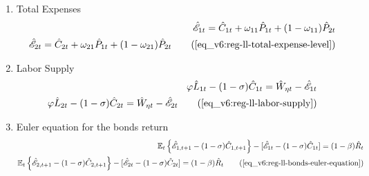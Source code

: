 \documentclass[../thesis.tex]{subfiles}
\begin{document}
{\begin{enumerate}
		
		\begin{comment}
			\item Regional Levels of Consumption and Prices
			\begin{align}
				\hat{C}_{1 1 t} - \hat{C}_{1 2 t} = \hat{P}_{2 t} - \hat{P}_{1 t} \nonumber \\
				\hat{C}_{2 1 t} - \hat{C}_{2 2 t} = \hat{P}_{2 t} - \hat{P}_{1 t} \tag{\ref{eq_v6:reg-ll-regional-consumption-and-prices}}
			\end{align}
		\end{comment}
	

		
		\item Total Expenses
		\begin{align}
			\hat{\mathscr{E}}_{1 t} = \hat{C}_{1 t} + \omega_{1 1} \hat{P}_{1 t} + (1 -\omega_{1 1}) \hat{P}_{2 t} \nonumber \\
			\hat{\mathscr{E}}_{2 t} = \hat{C}_{2 t} + \omega_{2 1} \hat{P}_{1 t} + (1 -\omega_{2 1}) \hat{P}_{2 t} \tag{\ref{eq_v6:reg-ll-total-expense-level}}
		\end{align}
		
		\item Labor Supply
		\begin{alignat}{2}
			\varphi \hat{L}_{1 t} - (1 -\sigma) \hat{C}_{1 t} = \hat{W}_{\eta t} - \hat{ \mathscr{E} }_{1 t} \nonumber \\
			\varphi \hat{L}_{2 t} - (1 -\sigma) \hat{C}_{2 t} = \hat{W}_{\eta t} - \hat{ \mathscr{E} }_{2 t} \tag{\ref{eq_v6:reg-ll-labor-supply}}
		\end{alignat}
		
		\item Euler equation for the bonds return
		\begin{alignat}{2}
			\E \left\{ \hat{\mathscr{E}}_{1, t+1} - (1 -\sigma)\hat{C}_{1, t+1} \right\} - [\hat{\mathscr{E}}_{1 t} - (1 -\sigma)\hat{C}_{1 t}] = (1 -\beta) \hat{R}_{t} \nonumber \\ %
			\E \left\{ \hat{\mathscr{E}}_{2, t+1} - (1 -\sigma)\hat{C}_{2, t+1} \right\} - [\hat{\mathscr{E}}_{2 t} - (1 -\sigma)\hat{C}_{2 t}] = (1 -\beta) \hat{R}_{t} \tag{\ref{eq_v6:reg-ll-bonds-euler-equation}} %
		\end{alignat}
		

\end{enumerate}}
\end{document}
